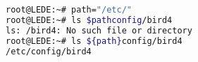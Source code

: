 \begin{lstlisting}[language=bash,caption={Variable encapsulation}]
root@LEDE:~# path="/etc/"
root@LEDE:~# ls $pathconfig/bird4
ls: /bird4: No such file or directory
root@LEDE:~# ls ${path}config/bird4
/etc/config/bird4
\end{lstlisting}